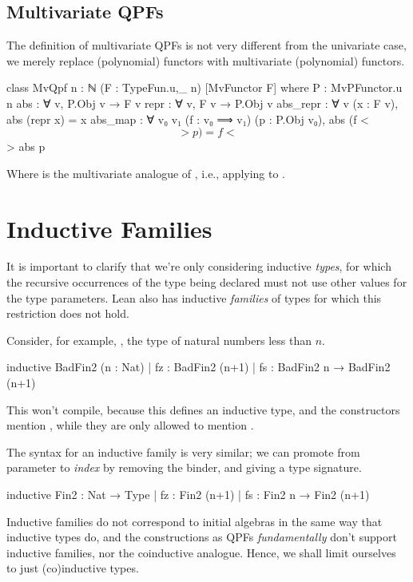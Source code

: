 \subsection*{Multivariate QPFs}
The definition of multivariate QPFs is not very different from the univariate case, we merely replace
(polynomial) functors with multivariate (polynomial) functors.

\begin{leancode}
  class MvQpf {n : ℕ} (F : TypeFun.{u,_} n) [MvFunctor F]  where
    P         : MvPFunctor.{u} n
    abs       : ∀ {v}, P.Obj v → F v
    repr      : ∀ {v}, F v → P.Obj v
    abs_repr  : ∀ {v} (x : F v), abs (repr x) = x
    abs_map   : ∀ {v₀ v₁} (f : v₀ ⟹ v₁) (p : P.Obj v₀), 
                    abs (f <$$> p) = f <$$> abs p
\end{leancode}

Where  is the multivariate analogue of , i.e., applying 
 to .


\section{Inductive Families}
\label{sec:ind_families}

It is important to clarify that we're only considering inductive \emph{types}, 
for which the recursive occurrences of the type being declared must not use other values for the type parameters. Lean also has inductive \emph{families} of types for which this restriction does not hold.

Consider, for example, , the type of natural numbers less than $n$.
\begin{badleancode}
    inductive BadFin2 (n : Nat)
    | fz : BadFin2 (n+1)
    | fs : BadFin2 n → BadFin2 (n+1)
\end{badleancode}

This won't compile, because this defines an inductive type, and the constructors mention , while they are only allowed to mention .

The syntax for an inductive family is very similar; we can promote  from parameter to \emph{index} by removing the binder, and giving a type signature.

\begin{leancode}
    inductive Fin2 : Nat → Type
    | fz : Fin2 (n+1)
    | fs : Fin2 n → Fin2 (n+1)
\end{leancode}

Inductive families do not correspond to initial algebras in the same way that inductive types do, and the constructions as QPFs \emph{fundamentally} don't support inductive families, nor the coinductive analogue.
Hence, we shall limit ourselves to just (co)inductive types.
